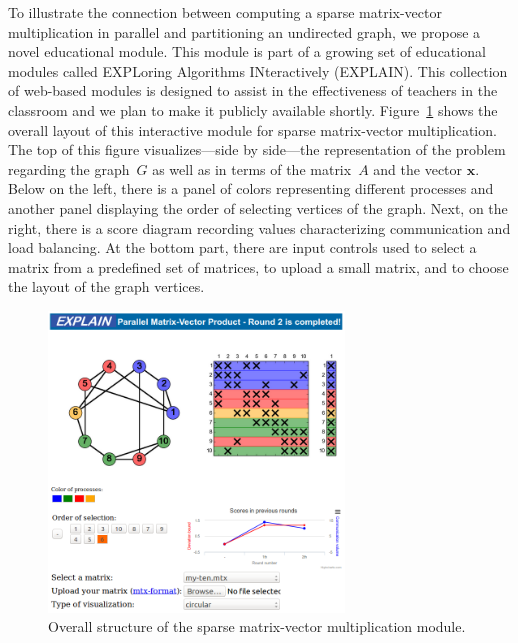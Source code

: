 \documentclass[12pt, twoside]{book}
\newcommand{\mat}[1]{\ensuremath{#1}}
\newcommand{\vek}[1]{{\ensuremath{\mathbf #1}}}
\begin{document}
To illustrate the connection between computing a sparse matrix-vector multiplication in
parallel and partitioning an undirected graph, we propose a novel educational module.
This module is part of a growing set of educational modules called EXPLoring Algorithms
INteractively (EXPLAIN). This collection of web-based modules is designed to assist in
the effectiveness of teachers in the classroom and we plan to make it publicly available
shortly. Figure~\ref{f.explain.matvec} shows the overall layout of this interactive
module for sparse matrix-vector multiplication. The top of this figure visualizes---side by side---the representation of the problem regarding the graph~$G$ as well as in terms
of the matrix~\mat{A} and the vector \vek{x}. Below on the left, there is a panel of
colors representing different processes and another panel displaying the order of
selecting vertices of the graph. Next, on the right, there is a score diagram recording
values characterizing communication and load balancing. At the bottom part, there are
input controls used to select a matrix from a predefined set of matrices, to upload a
small matrix, and to choose the layout of the graph vertices.


\begin{figure}
\centering
\includegraphics[width=0.7\textwidth]{final}
\caption{Overall structure of the sparse matrix-vector multiplication module.}
\label{f.explain.matvec}
\end{figure}
\end{document}
